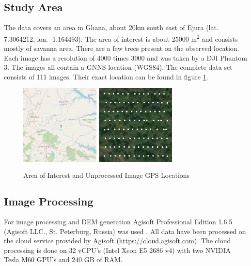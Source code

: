 \documentclass{isprs} %
\begin{document}
\subsection{Study Area}\label{sec:Study Area}
The data covers an area in Ghana, about 20km south east of Ejura (lat. 7.3064212, lon. -1.164493). 
The area of interest is about 25000 m\textsuperscript{2} and consists mostly of savanna area.
There are a few trees present on the observed location.
Each image has a resolution of 4000 times 3000 and was taken by a DJI Phantom 3.
The images all contain a GNNS location (WGS84). 
The complete data set consists of 111 images.
Their exact location can be found in figure \ref{fig:areaofinterest}.
\begin{figure}[h]
    \centering
    \includegraphics[width=4cm]{locationwide.png}
    \includegraphics[width=4cm]{imgloc.png}
    \caption{Area of Interest and Unprocessed Image GPS Locations}
    \label{fig:areaofinterest}
\end{figure}


\subsection{Image Processing}
For image processing and DEM generation Agisoft Professional Edition 1.6.5 (Agisoft LLC., St. Peterburg, Russia) was used \citep{AgisoftMetashape}.
All data have been processed on the cloud service provided by Agisoft (\url{https://cloud.agisoft.com}).
The cloud processing is done on 32 vCPU's (Intel Xeon E5 2686 v4) with two NVIDIA Tesla M60 GPU's and 240 GB of RAM.
\end{document}
